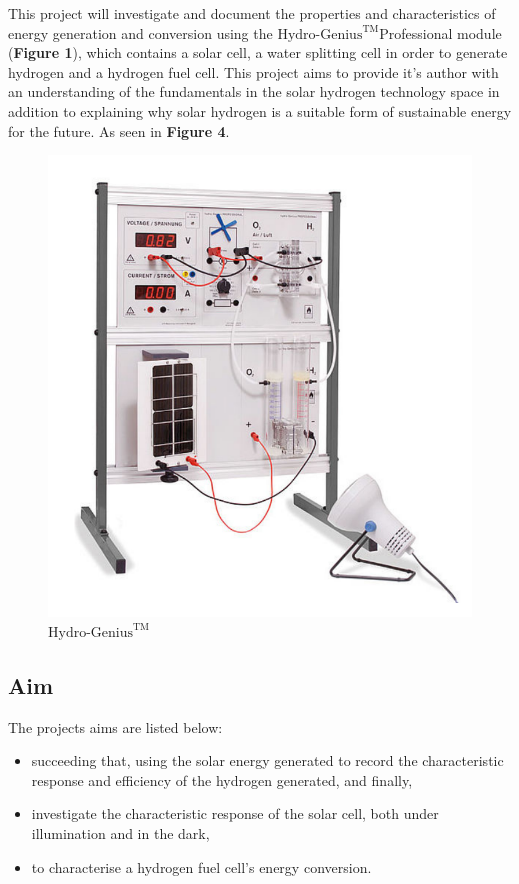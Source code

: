 \documentclass{article}
\begin{document}
    This project will investigate and document the properties and characteristics
    of energy generation and conversion using the \(\text{Hydro-Genius}^{\text{TM}}\)Professional module (\textbf{Figure 1}), 
    which contains a solar cell, a water splitting cell in order to generate hydrogen and 
    a hydrogen fuel cell. This project aims to provide it's author with an understanding 
    of the fundamentals in the solar hydrogen technology space in addition to explaining 
    why solar hydrogen is a suitable form of sustainable energy for the future. As seen in \textbf{Figure 4}.
    \begin{figure}
        \centering
        \includegraphics[scale=0.3]{./module.png}
        \caption{\(\text{Hydro-Genius}^{\text{TM}}\)\cite{SCE}}
    \end{figure}

    \subsection{Aim}
        The projects aims are listed below:
        \begin{itemize}
            \item succeeding that, using the solar energy generated to record the characteristic response and efficiency 
            of the hydrogen generated, and finally,
            \item investigate the characteristic response of the solar cell, both under illumination and in the dark,
            \item to characterise a hydrogen fuel cell's energy conversion.
        \end{itemize} 
\end{document}
